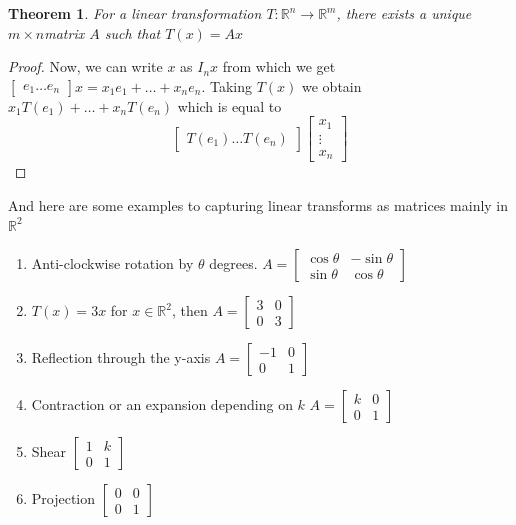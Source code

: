 \documentclass{article}
\newtheorem{thm}{Theorem}[subsection]
\numberwithin{equation}{subsection}
\begin{document}
\begin{thm}
For a linear transformation $T:\mathbb{R}^n \to \mathbb{R}^m$, there exists a unique $m\times n$matrix $A$ such that $T(x) = Ax$
\end{thm}

\begin{proof}
Now, we can write $x$ as $I_{n}x$ from which we get $\begin{bmatrix}
    e_{1} \ldots e_{n}
\end{bmatrix}x = x_{1}e_{1} + \ldots + x_{n}e_{n}$. Taking $T(x)$ we obtain $x_{1}T(e_{1}) + \ldots + x_{n}T(e_{n})$ which is equal to $$\begin{bmatrix}
    T(e_{1}) \ldots T(e_{n})
\end{bmatrix} \begin{bmatrix}
    x_{1} \\
    \vdots \\
    x_{n} 
\end{bmatrix}$$
\end{proof}

And here are some examples to capturing linear transforms as matrices mainly in $\mathbb{R}^2$
\begin{example}
\begin{enumerate}
    \item Anti-clockwise rotation by $\theta$ degrees. $A = \begin{bmatrix}
        \cos{\theta} & -\sin{\theta}\\
        \sin{\theta} & \cos{\theta}
    \end{bmatrix}$ 
    \item $T(x) = 3x$ for $x \in \mathbb{R} ^ 2$, then $A = \begin{bmatrix}
        3 & 0 \\
        0 & 3
    \end{bmatrix}$
    \item Reflection through the y-axis $A = \begin{bmatrix}
        -1 & 0\\
        0 & 1
    \end{bmatrix}$
    \item Contraction or an expansion depending on $k$ $ A = \begin{bmatrix}
        k & 0\\
        0 & 1
    \end{bmatrix}$ 
    \item Shear $\begin{bmatrix}
        1 & k\\
        0 & 1
    \end{bmatrix}$
    \item Projection $\begin{bmatrix}
        0 & 0\\
        0 & 1
    \end{bmatrix}$
    
\end{enumerate}
\end{example}
\end{document}
